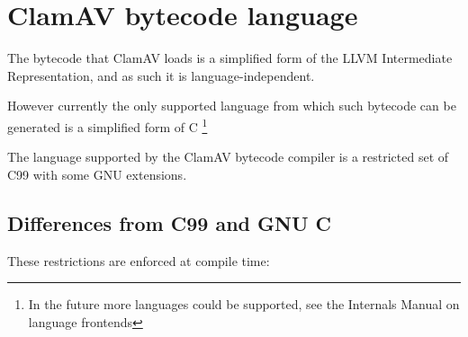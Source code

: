 \chapter{ClamAV bytecode language}
The bytecode that ClamAV loads is a simplified form of the LLVM Intermediate Representation, and as such it is language-independent.

However currently the only supported language from which such bytecode can be generated is a simplified form of C
\footnote{In the future more languages could be supported, see the Internals Manual on language frontends}

The language supported by the ClamAV bytecode compiler is a restricted set of C99 with some GNU extensions.

\section{Differences from C99 and GNU C}
\label{sec:diffc}
These restrictions are enforced at compile time:
